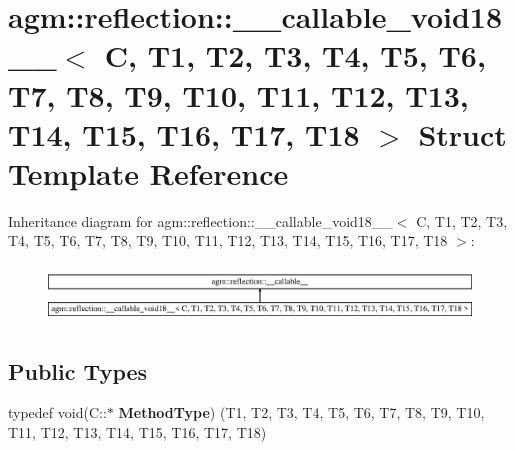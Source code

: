 \hypertarget{structagm_1_1reflection_1_1____callable__void18____}{}\section{agm\+:\+:reflection\+:\+:\+\_\+\+\_\+callable\+\_\+void18\+\_\+\+\_\+$<$ C, T1, T2, T3, T4, T5, T6, T7, T8, T9, T10, T11, T12, T13, T14, T15, T16, T17, T18 $>$ Struct Template Reference}
\label{structagm_1_1reflection_1_1____callable__void18____}
Inheritance diagram for agm\+:\+:reflection\+:\+:\+\_\+\+\_\+callable\+\_\+void18\+\_\+\+\_\+$<$ C, T1, T2, T3, T4, T5, T6, T7, T8, T9, T10, T11, T12, T13, T14, T15, T16, T17, T18 $>$\+:\begin{figure}[H]
\begin{center}
\leavevmode
\includegraphics[height=1.523810cm]{structagm_1_1reflection_1_1____callable__void18____}
\end{center}
\end{figure}
\subsection*{Public Types}
\begin{DoxyCompactItemize}
\item 
typedef void(C\+::$\ast$ {\bfseries Method\+Type}) (T1, T2, T3, T4, T5, T6, T7, T8, T9, T10, T11, T12, T13, T14, T15, T16, T17, T18)\hypertarget{structagm_1_1reflection_1_1____callable__void18_____a5f369a11c905096b254a5c337ac2e66b}{}\label{structagm_1_1reflection_1_1____callable__void18_____a5f369a11c905096b254a5c337ac2e66b}

\end{DoxyCompactItemize}
